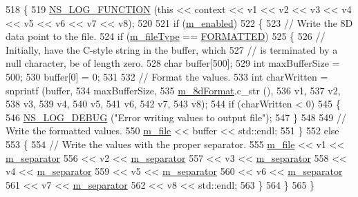 \begin{DoxyCode}
518 \{
519   \hyperlink{log-macros-disabled_8h_a90b90d5bad1f39cb1b64923ea94c0761}{NS\_LOG\_FUNCTION} (\textcolor{keyword}{this} << context << v1 << v2 << v3 << v4 << v5 << v6 << v7 << v8);
520 
521   \textcolor{keywordflow}{if} (\hyperlink{classns3_1_1DataCollectionObject_a3e8b0578f03044b1db4811ecff2be7ea}{m\_enabled})
522     \{
523       \textcolor{comment}{// Write the 8D data point to the file.}
524       \textcolor{keywordflow}{if} (\hyperlink{classns3_1_1FileAggregator_aa2a8abfe3082a802dc6705e701f73e9e}{m\_fileType} == \hyperlink{classns3_1_1FileAggregator_aedb3108205a498f7ac0c564508067e2da7e34fea5d3f680d09518ee58ce4711f0}{FORMATTED})
525         \{
526           \textcolor{comment}{// Initially, have the C-style string in the buffer, which}
527           \textcolor{comment}{// is terminated by a null character, be of length zero.}
528           \textcolor{keywordtype}{char} buffer[500];
529           \textcolor{keywordtype}{int} maxBufferSize = 500;
530           buffer[0] = 0;
531 
532           \textcolor{comment}{// Format the values.}
533           \textcolor{keywordtype}{int} charWritten = snprintf (buffer,
534                                       maxBufferSize,
535                                       \hyperlink{classns3_1_1FileAggregator_adb1cc33d1eff8d031a3debddba92b9a5}{m\_8dFormat}.c\_str (),
536                                       v1,
537                                       v2,
538                                       v3,
539                                       v4,
540                                       v5,
541                                       v6,
542                                       v7,
543                                       v8);
544           \textcolor{keywordflow}{if} (charWritten < 0)
545             \{
546               \hyperlink{group__logging_ga413f1886406d49f59a6a0a89b77b4d0a}{NS\_LOG\_DEBUG} (\textcolor{stringliteral}{"Error writing values to output file"});
547             \}
548 
549           \textcolor{comment}{// Write the formatted values.}
550           \hyperlink{classns3_1_1FileAggregator_a756affa0d614724be513ceedcff62ac0}{m\_file} << buffer << std::endl;
551         \}
552       \textcolor{keywordflow}{else}
553         \{
554           \textcolor{comment}{// Write the values with the proper separator.}
555           \hyperlink{classns3_1_1FileAggregator_a756affa0d614724be513ceedcff62ac0}{m\_file} << v1 << \hyperlink{classns3_1_1FileAggregator_a1f74a4c07f663d535da56dfb70414a15}{m\_separator}
556                  << v2 << \hyperlink{classns3_1_1FileAggregator_a1f74a4c07f663d535da56dfb70414a15}{m\_separator}
557                  << v3 << \hyperlink{classns3_1_1FileAggregator_a1f74a4c07f663d535da56dfb70414a15}{m\_separator}
558                  << v4 << \hyperlink{classns3_1_1FileAggregator_a1f74a4c07f663d535da56dfb70414a15}{m\_separator}
559                  << v5 << \hyperlink{classns3_1_1FileAggregator_a1f74a4c07f663d535da56dfb70414a15}{m\_separator}
560                  << v6 << \hyperlink{classns3_1_1FileAggregator_a1f74a4c07f663d535da56dfb70414a15}{m\_separator}
561                  << v7 << \hyperlink{classns3_1_1FileAggregator_a1f74a4c07f663d535da56dfb70414a15}{m\_separator}
562                  << v8 << std::endl;
563         \}
564     \}
565 \}
\end{DoxyCode}
